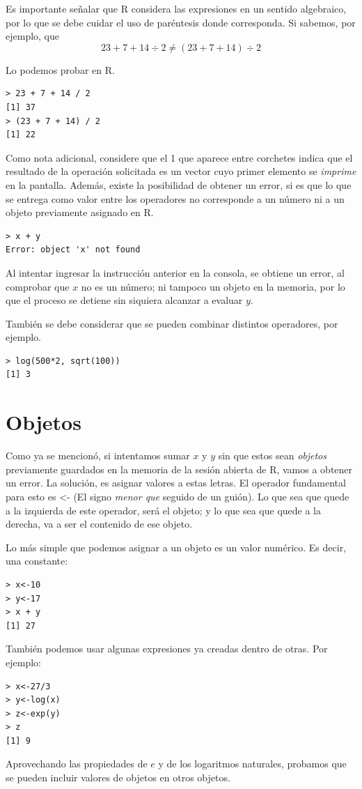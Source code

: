 \documentclass[letterpaper,11pt]{article}
\begin{document}
Es importante señalar que R considera las expresiones en un sentido algebraico, por lo que se debe cuidar el uso de paréntesis donde corresponda. Si sabemos, por ejemplo, que 
\begin{equation*}
23 + 7 + 14 \div 2 \neq (23 + 7 + 14)\div 2
\end{equation*}

Lo podemos probar en R.

\begin{lstlisting}
> 23 + 7 + 14 / 2
[1] 37
> (23 + 7 + 14) / 2
[1] 22
\end{lstlisting}

Como nota adicional, considere que el 1 que aparece entre corchetes indica que el resultado de la operación solicitada es un vector cuyo primer elemento se \emph{imprime} en la pantalla. Además, existe la posibilidad de obtener un error, si es que lo que se entrega como valor entre los operadores no corresponde a un número ni a un objeto previamente asignado en R.

\begin{lstlisting}
> x + y
Error: object 'x' not found
\end{lstlisting}

Al intentar ingresar la instrucción anterior en la consola, se obtiene un error, al comprobar que $x$ no es un número; ni tampoco un objeto en la memoria, por lo que el proceso se detiene sin siquiera alcanzar a evaluar $y$.

También se debe considerar que se pueden combinar distintos operadores, por ejemplo.

\begin{lstlisting}
> log(500*2, sqrt(100))
[1] 3
\end{lstlisting}

\section{Objetos}

Como ya se mencionó, si intentamos sumar $x$ y $y$ sin que estos sean \emph{objetos} previamente guardados en la memoria de la sesión abierta de R, vamos a obtener un error. La solución, es asignar valores a estas letras. El operador fundamental para esto es {\ttfamily <-} (El signo \emph{menor que} seguido de un guión). Lo que sea que quede a la izquierda de este operador, será el objeto; y lo que sea que quede a la derecha, va a ser el contenido de ese objeto.

Lo más simple que podemos asignar a un objeto es un valor numérico. Es decir, una constante:

\begin{lstlisting}
> x<-10
> y<-17
> x + y
[1] 27
\end{lstlisting}

También podemos usar algunas expresiones ya creadas dentro de otras. Por ejemplo:

\begin{lstlisting}
> x<-27/3
> y<-log(x)
> z<-exp(y)
> z
[1] 9
\end{lstlisting}

Aprovechando las propiedades de $e$ y de los logaritmos naturales, probamos que se pueden incluir valores de objetos en otros objetos.
\end{document}
